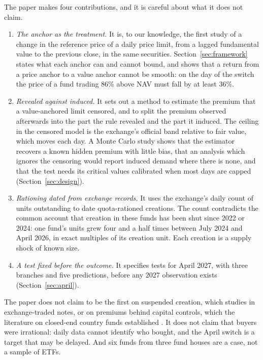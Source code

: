 \documentclass[11pt,a4paper]{article}
\theoremstyle{definition}
\begin{document}
The paper makes four contributions, and it is careful about what it does not claim.
\begin{enumerate}
\item \emph{The anchor as the treatment.} It is, to our knowledge, the first study of a change in the reference price of a daily price limit, from a lagged fundamental value to the previous close, in the same securities. Section~\ref{sec:framework} states what each anchor can and cannot bound, and shows that a return from a price anchor to a value anchor cannot be smooth: on the day of the switch the price of a fund trading 86\% above NAV must fall by at least 36\%.
\item \emph{Revealed against induced.} It sets out a method to estimate the premium that a value-anchored limit censored, and to split the premium observed afterwards into the part the rule revealed and the part it induced. The ceiling in the censored model is the exchange's official band relative to fair value, which moves each day. A Monte Carlo study shows that the estimator recovers a known hidden premium with little bias, that an analysis which ignores the censoring would report induced demand where there is none, and that the test needs its critical values calibrated when most days are capped (Section~\ref{sec:design}).
\item \emph{Rationing dated from exchange records.} It uses the exchange's daily count of units outstanding to date quota-rationed creations. The count contradicts the common account that creation in these funds has been shut since 2022 or 2024: one fund's units grew four and a half times between July 2024 and April 2026, in exact multiples of its creation unit. Each creation is a supply shock of known size.
\item \emph{A test fixed before the outcome.} It specifies tests for April 2027, with three branches and five predictions, before any 2027 observation exists (Section~\ref{sec:april}).
\end{enumerate}
The paper does not claim to be the first on suspended creation, which \citet{johnson2016essays} studies in exchange-traded notes, or on premiums behind capital controls, which the literature on closed-end country funds established \citep{bonserneal1990international}. It does not claim that buyers were irrational: daily data cannot identify who bought, and the April switch is a target that may be delayed. And six funds from three fund houses are a case, not a sample of ETFs.
\end{document}

